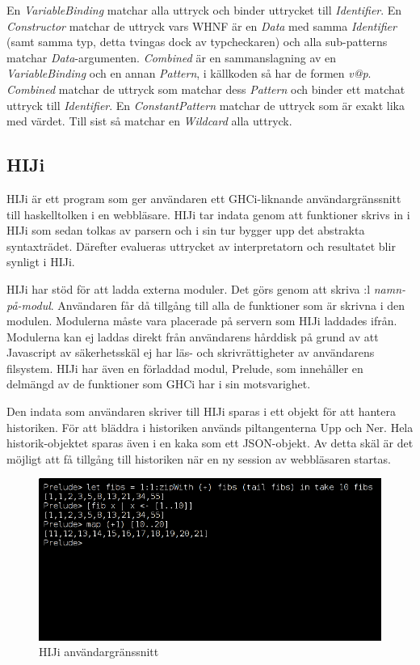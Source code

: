 En \emph{VariableBinding} matchar alla uttryck och binder uttrycket till \emph{Identifier}. En \emph{Constructor} matchar de uttryck vars WHNF är en \emph{Data} med samma \emph{Identifier} (samt samma typ, detta tvingas dock av typcheckaren) och alla sub-patterns matchar \emph{Data}-argumenten. \emph{Combined} är en sammanslagning av en \emph{VariableBinding} och en annan \emph{Pattern}, i källkoden så har de formen \emph{v@p}. \emph{Combined} matchar de uttryck som matchar dess \emph{Pattern} och binder ett matchat uttryck till \emph{Identifier}. En \emph{ConstantPattern} matchar de uttryck som är exakt lika med värdet. Till sist så matchar en \emph{Wildcard} alla uttryck.

\subsection{HIJi}

HIJi är ett program som ger användaren ett GHCi-liknande användargränssnitt till haskelltolken i en webbläsare.
HIJi tar indata genom att funktioner skrivs in i HIJi som sedan tolkas av parsern och i sin tur bygger upp det abstrakta syntaxträdet. Därefter evalueras uttrycket av interpretatorn och resultatet blir synligt i HIJi.

HIJi har stöd för att ladda externa moduler. Det görs genom att skriva :l \emph{namn-på-modul}. Användaren får då tillgång till alla de funktioner som är skrivna i den modulen. Modulerna måste vara placerade på servern som HIJi laddades ifrån. Modulerna kan ej laddas direkt från användarens hårddisk på grund av att Javascript av säkerhetsskäl ej har läs- och skrivrättigheter av användarens filsystem. HIJi har även en förladdad modul, Prelude, som innehåller en delmängd av de funktioner som GHCi har i sin motsvarighet. 

Den indata som användaren skriver till HIJi sparas i ett objekt för att hantera historiken. För att bläddra i historiken används piltangenterna Upp och Ner. Hela historik-objektet sparas även i en kaka som ett JSON-objekt. Av detta skäl är det möjligt att få tillgång till historiken när en ny session av webbläsaren startas.

% 
\begin{figure}[H]
    \begin{center}
        \includegraphics[width=1\textwidth]{hiji_screen3.png}
        \caption{HIJi användargränssnitt}
        \label{fig:hiji} %
    \end{center}
\end{figure}

